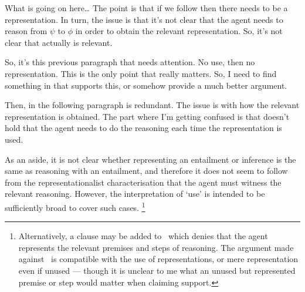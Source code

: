 \begin{note}[Representationalism]
  {
    \color{red}
    What is going on here\dots
    The point is that if we follow \citeauthor{Neta:2019aa} then there needs to be a representation.
    In turn, the issue is that it's not clear that the agent needs to reason from \(\psi\) to \(\phi\) in order to obtain the relevant representation.
    So, it's not clear that \citeauthor{Neta:2019aa} actually is relevant.

    So, it's this previous paragraph that needs attention.
    No use, then no representation.
    This is the only point that really matters.
    So, I need to find something in \citeauthor{Neta:2019aa} that supports this, or somehow provide a much better argument.

    Then, in the following paragraph is redundant.
    The issue is with how the relevant representation is obtained.
    The part where I'm getting confused is that \citeauthor{Neta:2019aa} doesn't hold that the agent needs to do the reasoning each time the representation is used.
  }

  As an aside, it is not clear whether representing an entailment or inference is the same as reasoning with an entailment, and therefore it does not seem to follow from the representationalist characterisation that the agent must witness the relevant reasoning.
  However, the interpretation of `use' is intended to be sufficiently broad to cover such cases.\nolinebreak
  \footnote{
    Alternatively, a clause may be added to~\ESU{} which denies that the agent represents the relevant premises and steps of reasoning.
    The argument made against~\ESU{} is compatible with the use of representations, or mere representation even if unused --- though it is unclear to me what an unused but represented premise or step would matter when claiming support.
  }


\end{note}
